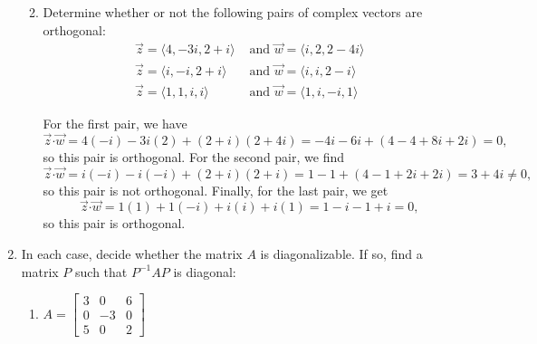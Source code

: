 \documentclass[letterpaper,12pt]{article}
\newcommand{\dotp}{\boldsymbol{\cdot}}
\begin{document}
\begin{enumerate}
\begin{enumerate}
\bigskip

 \item Determine whether or not the following pairs of complex vectors are orthogonal:
\begin{align*}
 \vec{z} = \langle 4, -3i,2+i\rangle & \text{ and } \vec{w} = \langle i, 2, 2-4i\rangle\\
 \vec{z} = \langle i, -i, 2+i\rangle &\text{ and } \vec{w} = \langle i, i, 2-i\rangle\\
 \vec{z} = \langle 1, 1, i, i\rangle & \text{ and } \vec{w} = \langle 1, i, -i, 1\rangle
\end{align*}

\bigskip

For the first pair, we have
\[
 \vec{z}\dotp\vec{w}=4(-i)-3i(2)+(2+i)(2+4i) = -4i-6i+(4-4+8i+2i)=0,
\]
so this pair is orthogonal. For the second pair, we find
\[
 \vec{z}\dotp\vec{w}=i(-i)-i(-i)+(2+i)(2+i) = 1-1+(4-1+2i+2i) = 3+4i\neq 0,
\]
so this pair is not orthogonal. Finally, for the last pair, we get
\[
 \vec{z}\dotp\vec{w} = 1(1)+1(-i)+i(i)+i(1) = 1-i-1+i=0,
\]
so this pair is orthogonal.

\end{enumerate}

\bigskip

\item In each case, decide whether the matrix $A$ is diagonalizable. If so, find a matrix $P$ such that $P^{-1}AP$ is diagonal:
\begin{enumerate}
 \item $A=\begin{bmatrix}
           3&0&6\\0&-3&0\\5&0&2
          \end{bmatrix}$

\bigskip


\end{enumerate}
\end{enumerate}
\end{document}
